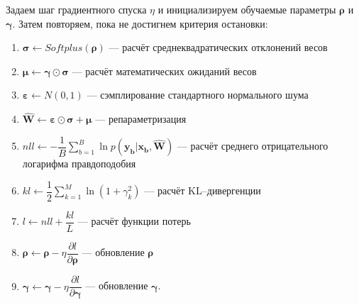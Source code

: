 \documentclass{article}
\numberwithin{equation}{section}
\begin{document}
    Задаем шаг градиентного спуска $\eta$ и инициализируем обучаемые параметры
    $\pmb{\rho}$ и $\pmb{\gamma}$.
    Затем повторяем, пока не достигнем критерия остановки:
    \begin{enumerate}
        \item
            $
                \pmb{\sigma}
                \leftarrow
                Softplus(\pmb{\rho})
            $ --- расчёт среднеквадратических отклонений весов
        \item
            $
                \pmb{\mu}
                \leftarrow
                    \pmb{\gamma}
                    \odot
                    \pmb{\sigma}
            $ --- расчёт математических ожиданий весов
        \item
            $
                \pmb{\varepsilon}
                \leftarrow
                N(0, 1)
            $ --- сэмплирование стандартного нормального шума
        \item
            $
                \hat{\pmb{W}}
                \leftarrow
                    \pmb{\varepsilon}
                    \odot
                    \pmb{\sigma}
                    +
                    \pmb{\mu}
            $ --- репараметризация
        \item
            $
                nll
                \leftarrow
                    -\dfrac{1}{B}
                    \sum_{b=1}^{B}{
                        \ln{
                            p(
                                \pmb{y_{b}} | \pmb{x_{b}}, \pmb{\hat{W}}
                            )
                        }
                    }
            $ --- расчёт среднего отрицательного логарифма правдоподобия
        \item
            $
                kl
                \leftarrow
                    \dfrac{1}{2}
                    \sum_{k=1}^{M}
                    \ln(
                        {1 + \gamma_{k}^{2}}
                    )
            $ --- расчёт KL--дивергенции
        \item
            $
                l
                \leftarrow
                    nll + \dfrac{kl}{L}
            $ --- расчёт функции потерь
        \item
            $
                \pmb{\rho}
                \leftarrow
                    \pmb{\rho}
                    -
                    \eta
                    \dfrac
                        {\partial l}
                        {\partial \pmb{\rho}}
            $ --- обновление $\pmb{\rho}$
        \item
            $
                \pmb{\gamma}
                \leftarrow
                    \pmb{\gamma}
                    -
                    \eta
                    \dfrac
                        {\partial l}
                        {\partial \pmb{\gamma}}
            $ --- обновление $\pmb{\gamma}$.
    \end{enumerate}
\end{document}
